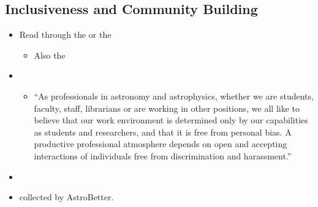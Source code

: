 \documentclass[letterpaper,10pt,english]{sphinxmanual}
\begin{document}
\subsection{Inclusiveness and Community Building}
\label{\detokenize{resource/research/getting_started:inclusiveness-and-community-building}}\begin{itemize}
\item {} 
Read through the  or
the 
\begin{itemize}
\item {} 
Also the 

\end{itemize}

\item {} 
\begin{itemize}
\item {} 
“As professionals in astronomy and astrophysics, whether we are
students, faculty, staff, librarians or are working in other
positions, we all like to believe that our work environment is
determined only by our capabilities as students and researchers,
and that it is free from personal bias. A productive professional
atmosphere depends on open and accepting interactions of
individuals free from discrimination and harassment.”

\end{itemize}

\item {} 

\item {} 
 collected by
AstroBetter.

\end{itemize}
\end{document}
